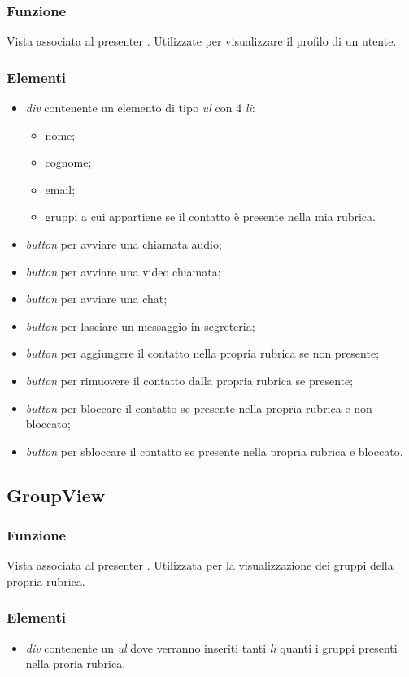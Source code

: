 \subsubsection*{Funzione}
Vista associata al presenter . Utilizzate per visualizzare il profilo di un utente.
\subsubsection*{Elementi}
\begin{itemize}
\item \textit{div} contenente un elemento di tipo \textit{ul} con 4 \textit{li}:
\begin{itemize}
\item nome;
\item cognome;
\item email;
\item gruppi a cui appartiene se il contatto è presente nella mia rubrica.
\end{itemize}
\item \textit{button} per avviare una chiamata audio;
\item \textit{button} per avviare una video chiamata;
\item \textit{button} per avviare una chat;
\item \textit{button} per lasciare un messaggio in segreteria;
\item \textit{button} per aggiungere il contatto nella propria rubrica se non presente;
\item \textit{button} per rimuovere il contatto dalla propria rubrica se presente;
\item \textit{button} per bloccare il contatto se presente nella propria rubrica e non bloccato;
\item \textit{button} per sbloccare il contatto se presente nella propria rubrica e bloccato.
\end{itemize}

\subsection{GroupView}
\subsubsection*{Funzione}
Vista associata al presenter . Utilizzata per la visualizzazione dei gruppi della propria rubrica.
\subsubsection*{Elementi}
\begin{itemize}
\item \textit{div} contenente un \textit{ul} dove verranno inseriti tanti \textit{li} quanti i gruppi presenti nella proria rubrica.
\end{itemize}

